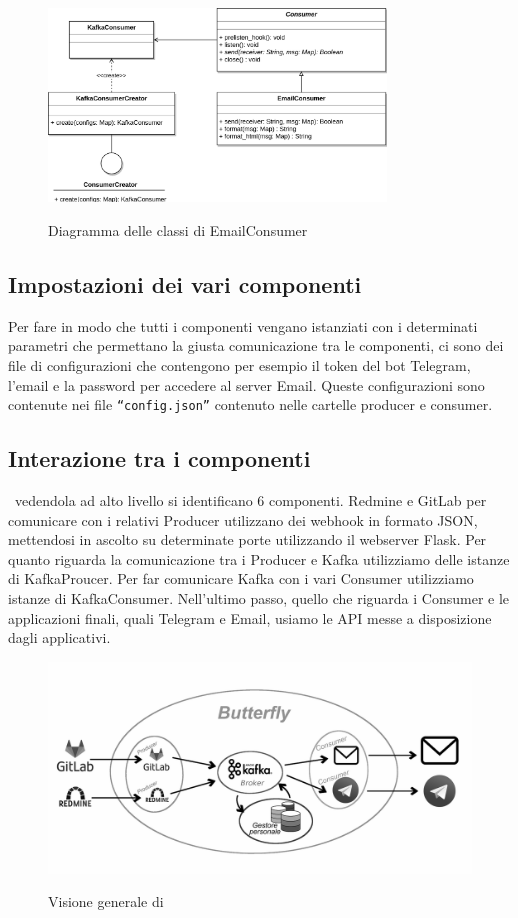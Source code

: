 \begin{figure}[H]
    \centering
    \includegraphics[width=0.8\textwidth]{img/Consumers-EmailConsumer.png}\\
    \caption{Diagramma delle classi di EmailConsumer}
\end{figure}


\subsection{Impostazioni dei vari componenti}

Per fare in modo che tutti i componenti vengano istanziati con i determinati parametri che permettano la giusta comunicazione tra le componenti,
ci sono dei file di configurazioni che contengono per esempio il token del bot Telegram, l'email e la password per accedere al server Email. Queste configurazioni
sono contenute nei file \texttt{``config.json''} contenuto nelle cartelle producer e consumer.

\subsection{Interazione tra i componenti}

\progetto\ vedendola ad alto livello si identificano 6 componenti. Redmine e GitLab per comunicare con i relativi Producer utilizzano dei webhook in formato JSON,
mettendosi in ascolto su determinate porte utilizzando il webserver Flask. Per quanto riguarda la comunicazione tra i Producer e Kafka utilizziamo delle istanze
di KafkaProucer. Per far comunicare Kafka con i vari Consumer utilizziamo istanze di KafkaConsumer. Nell'ultimo passo, quello che riguarda i Consumer e le applicazioni finali, quali Telegram e Email, usiamo le API messe a disposizione dagli applicativi.

\begin{figure}[H]
    \centering
    \includegraphics[width=\textwidth]{img/butterfly.png}\\
    \caption{Visione generale di \progetto}
    \label{fig:butterfly}
\end{figure}
